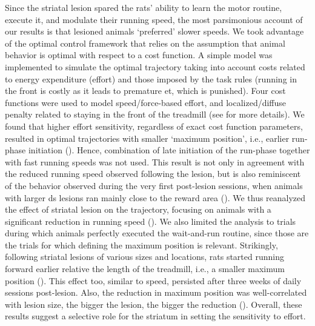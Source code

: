 Since the striatal lesion spared the rats' ability to learn the motor routine, execute it, and modulate their running speed, the most parsimonious account of our results is that lesioned animals `preferred' slower speeds.
We took advantage of the optimal control framework that relies on the assumption that animal behavior is optimal with respect to a cost function.
A simple model was implemented to simulate the optimal trajectory taking into account costs related to energy expenditure (effort) and those imposed by the task rules (running in the front is costly as it leads to premature \gls{et}, which is punished).
Four cost functions were used to model speed/force-based effort, and localized/diffuse penalty related to staying in the front of the treadmill (see \cite{JuradoParras2020} for more details).
We found that higher effort sensitivity, regardless of exact cost function parameters, resulted in optimal trajectories with smaller `maximum position', i.e., earlier run-phase initiation ().
Hence, combination of late initiation of the run-phase together with fast running speeds was not used.
This result is not only in agreement with the reduced running speed observed following the lesion, but is also reminiscent of the behavior observed during the very first post-lesion sessions, when animals with larger \gls{ds} lesions ran mainly close to the reward area ().
We thus reanalyzed the effect of striatal lesion on the trajectory, focusing on animals with a significant reduction in running speed ().
We also limited the analysis to trials during which animals perfectly executed the wait-and-run routine, since those are the trials for which defining the maximum position is relevant.
Strikingly, following striatal lesions of various sizes and locations, rats started running forward earlier relative the length of the treadmill, i.e., a smaller maximum position ().
This effect too, similar to speed, persisted after three weeks of daily sessions post-lesion.
Also, the reduction in maximum position was well-correlated with lesion size, the bigger the lesion, the bigger the reduction ().
Overall, these results suggest a selective role for the striatum in setting the sensitivity to effort.